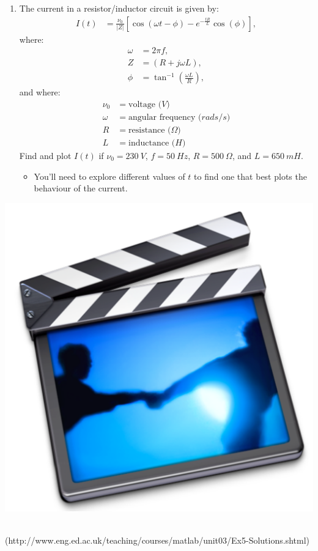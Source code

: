 {\begin{minipage}{\linewidth}
\begin{enumerate}
\item The current in a resistor/inductor circuit is given by:
\begin{align*}
I(t) &= \frac{\nu_0}{|Z|} \left[ \cos(\omega t - \phi) - e^{-\frac{tR}{L}} \cos(\phi) \right],
\end{align*}
where:
\begin{align*}
\omega & = 2\pi f, \\
Z &= (R + j \omega L), \\
\phi &= \tan^{-1}\left(\frac{\omega L}{R}\right),
\end{align*}
and where:
\begin{align*}
\nu_0 &= \textrm{voltage ($V$)} \\
\omega &= \textrm{angular frequency ($rads/s$)} \\
R &= \textrm{resistance ($\Omega$)} \\
L &= \textrm{inductance ($H$)}
\end{align*}
Find and plot $I(t)$ if $\nu_0=230~V$, $f=50~Hz$, $R=500~\Omega$, and $L=650~mH$.
\begin{itemize}
	\item You'll need to explore different values of $t$ to find one that best plots the behaviour of the current.
	\end{itemize}
\end{enumerate}

\begin{minipage}{6mm}
\includegraphics[scale=0.03]{Graphics/General/screencast_icon}
\end{minipage}
\href{http://www.eng.ed.ac.uk/teaching/courses/matlab/unit03/Ex5-Solutions.shtml}{}\\
(http://www.eng.ed.ac.uk/teaching/courses/matlab/unit03/Ex5-Solutions.shtml)
\end{minipage}%
}\\
